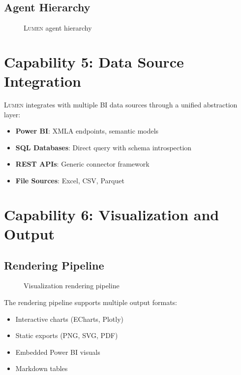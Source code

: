 \documentclass[11pt,a4paper]{article}
\theoremstyle{definition}
\theoremstyle{remark}
\newcommand{\lumen}{\textsc{Lumen}\xspace}
\begin{document}
\subsection{Agent Hierarchy}

\begin{figure}[H]
    \centering
    \vspace{0.5em}
    
    \vspace{0.5em}
    \caption{\lumen agent hierarchy}
    \label{fig:agent-hierarchy}
\end{figure}

\section{Capability 5: Data Source Integration}
\label{sec:integration}

\lumen integrates with multiple BI data sources through a unified abstraction layer:

\begin{itemize}
    \item \textbf{Power BI}: XMLA endpoints, semantic models
    \item \textbf{SQL Databases}: Direct query with schema introspection
    \item \textbf{REST APIs}: Generic connector framework
    \item \textbf{File Sources}: Excel, CSV, Parquet
\end{itemize}

\section{Capability 6: Visualization and Output}
\label{sec:visualization}

\subsection{Rendering Pipeline}

\begin{figure}[H]
    \centering
    
    \caption{Visualization rendering pipeline}
    \label{fig:rendering}
\end{figure}

The rendering pipeline supports multiple output formats:
\begin{itemize}
    \item Interactive charts (ECharts, Plotly)
    \item Static exports (PNG, SVG, PDF)
    \item Embedded Power BI visuals
    \item Markdown tables
\end{itemize}
\end{document}
